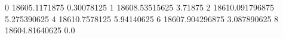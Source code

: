 0 18605.1171875 0.30078125
1 18608.53515625 3.71875
2 18610.091796875 5.275390625
4 18610.7578125 5.94140625
6 18607.904296875 3.087890625
8 18604.81640625 0.0
